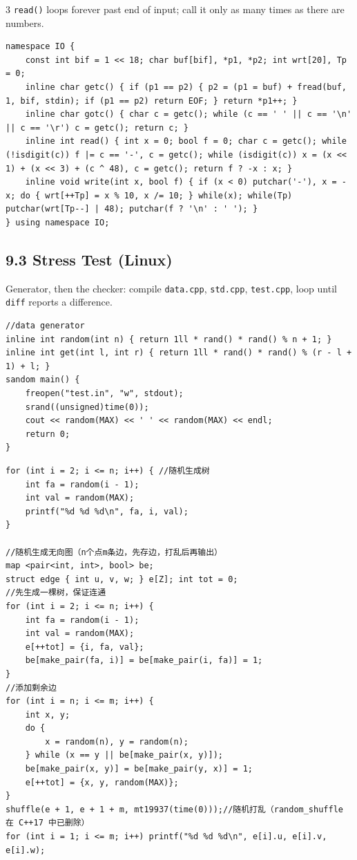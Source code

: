 \documentclass[8pt]{extarticle}
\begin{document}
\begin{multicols*}{3}
\texttt{read()} loops forever past end of input; call it only as many times as there are numbers.


\begin{lstlisting}
namespace IO {
    const int bif = 1 << 18; char buf[bif], *p1, *p2; int wrt[20], Tp = 0;
    inline char getc() { if (p1 == p2) { p2 = (p1 = buf) + fread(buf, 1, bif, stdin); if (p1 == p2) return EOF; } return *p1++; }
    inline char gotc() { char c = getc(); while (c == ' ' || c == '\n' || c == '\r') c = getc(); return c; }
    inline int read() { int x = 0; bool f = 0; char c = getc(); while (!isdigit(c)) f |= c == '-', c = getc(); while (isdigit(c)) x = (x << 1) + (x << 3) + (c ^ 48), c = getc(); return f ? -x : x; }
    inline void write(int x, bool f) { if (x < 0) putchar('-'), x = -x; do { wrt[++Tp] = x % 10, x /= 10; } while(x); while(Tp) putchar(wrt[Tp--] | 48); putchar(f ? '\n' : ' '); }
} using namespace IO;
\end{lstlisting}

\subsection*{9.3 Stress Test (Linux)}

Generator, then the checker: compile \texttt{data.cpp}, \texttt{std.cpp}, \texttt{test.cpp}, loop until \texttt{diff} reports a difference.


\begin{lstlisting}
//data generator
inline int random(int n) { return 1ll * rand() * rand() % n + 1; }
inline int get(int l, int r) { return 1ll * rand() * rand() % (r - l + 1) + l; }
sandom main() {
    freopen("test.in", "w", stdout);
    srand((unsigned)time(0));
    cout << random(MAX) << ' ' << random(MAX) << endl;
    return 0;
}
\end{lstlisting}

\begin{lstlisting}
for (int i = 2; i <= n; i++) { //随机生成树
    int fa = random(i - 1);
    int val = random(MAX);
    printf("%d %d %d\n", fa, i, val);
}

//随机生成无向图（n个点m条边，先存边，打乱后再输出）
map <pair<int, int>, bool> be;
struct edge { int u, v, w; } e[Z]; int tot = 0;
//先生成一棵树，保证连通
for (int i = 2; i <= n; i++) {
    int fa = random(i - 1);
    int val = random(MAX);
    e[++tot] = {i, fa, val};
    be[make_pair(fa, i)] = be[make_pair(i, fa)] = 1;
}
//添加剩余边
for (int i = n; i <= m; i++) {
    int x, y;
    do {
        x = random(n), y = random(n);
    } while (x == y || be[make_pair(x, y)]);
    be[make_pair(x, y)] = be[make_pair(y, x)] = 1;
    e[++tot] = {x, y, random(MAX)};
}
shuffle(e + 1, e + 1 + m, mt19937(time(0)));//随机打乱（random_shuffle 在 C++17 中已删除）
for (int i = 1; i <= m; i++) printf("%d %d %d\n", e[i].u, e[i].v, e[i].w);
\end{lstlisting}


\end{multicols*}
\end{document}
